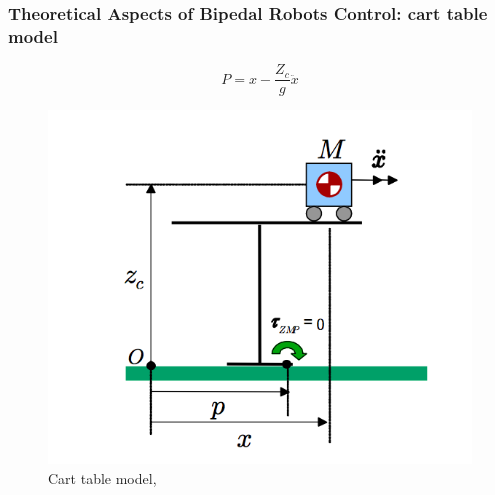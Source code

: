 \documentclass{beamer}
\begin{document}

	\begin{frame}
		\frametitle{Theoretical Aspects of Bipedal Robots Control: cart table model}
		\begin{equation}
			P = x - \dfrac{Z_c}{g} \ddot{x}
		\end{equation}		
		\begin{figure}[h!]
			\begin{minipage}[H]{\linewidth}
				\centering
				\includegraphics[width=0.4\linewidth]{presentation_images/11}
				\caption{Cart table model, \cite{kajita2003biped}}
			\end{minipage}
		\end{figure}
	\end{frame}

\end{document}

